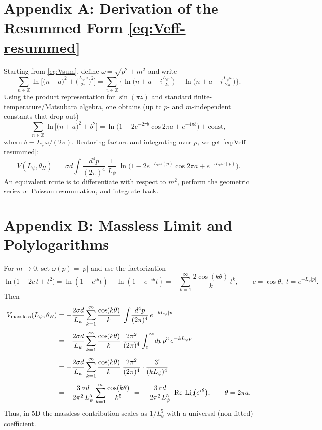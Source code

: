 \documentclass[12pt]{article}
\begin{document}
\section*{Appendix A: Derivation of the Resummed Form \eqref{eq:Veff-resummed}}
Starting from \eqref{eq:Vsum}, define $\omega=\sqrt{p^2+m^2}$ and write
\begin{equation}
\sum_{n\in\mathbb{Z}}\ln\!\Big[ \big(n+a\big)^2 + \big(\tfrac{L_\psi \omega}{2\pi}\big)^2 \Big]
= \sum_{n\in\mathbb{Z}} \Big\{ \ln\!\big( n+a + i \tfrac{L_\psi\omega}{2\pi} \big) + \ln\!\big( n+a - i \tfrac{L_\psi\omega}{2\pi} \big) \Big\}.
\end{equation}
Using the product representation for $\sin(\pi z)$
and standard finite-temperature/Matsubara algebra, one obtains (up to $p$- and $m$-independent constants that drop out)
\begin{equation}
\sum_{n\in\mathbb{Z}}\ln\!\Big[ \big(n+a\big)^2 + b^2 \Big]
= \ln\!\Big(1 - 2 e^{-2\pi b} \cos 2\pi a + e^{-4\pi b}\Big) + \text{const},
\end{equation}
where $b=L_\psi \omega/(2\pi)$.
Restoring factors and integrating over $p$, we get \eqref{eq:Veff-resummed}:
\begin{equation}
V(L_\psi,\theta_H) \;=\; \sigma d \int \!\frac{d^4p}{(2\pi)^4}\; \frac{1}{L_\psi}\;
\ln\!\Big(1 - 2 e^{-L_\psi \omega(p)} \cos 2\pi a + e^{-2 L_\psi \omega(p)}\Big).
\end{equation}
An equivalent route is to differentiate with respect to $m^2$, perform the geometric series or Poisson resummation, and integrate back.

\section*{Appendix B: Massless Limit and Polylogarithms}
For $m\to 0$, set $\omega(p)=|p|$ and use the factorization
\begin{equation}
\ln\!\big(1 - 2 c\, t + t^2\big) = \ln(1-e^{i\theta} t)+\ln(1-e^{-i\theta} t)
= - \sum_{k=1}^\infty \frac{2 \cos(k\theta)}{k}\, t^k,
\qquad c=\cos\theta,\; t=e^{-L_\psi |p|}.
\end{equation}
Then
\begin{align}
V_{\rm massless}(L_\psi,\theta_H)
&= - \frac{2\sigma d}{L_\psi} \sum_{k=1}^\infty \frac{\cos(k\theta)}{k}\;
\int \!\frac{d^4p}{(2\pi)^4}\, e^{-k L_\psi |p|}
\\[4pt]
&= - \frac{2\sigma d}{L_\psi} \sum_{k=1}^\infty \frac{\cos(k\theta)}{k}\;
\frac{2\pi^2}{(2\pi)^4} \int_0^\infty\! dp\, p^3\, e^{-k L_\psi p}
\\[4pt]
&= - \frac{2\sigma d}{L_\psi} \sum_{k=1}^\infty \frac{\cos(k\theta)}{k}\;
\frac{2\pi^2}{(2\pi)^4} \cdot \frac{3!}{(k L_\psi)^4}
\\[4pt]
&= - \frac{3\,\sigma d}{2\pi^2\, L_\psi^5} \sum_{k=1}^\infty \frac{\cos(k\theta)}{k^5}
\;=\; - \frac{3\,\sigma d}{2\pi^2\, L_\psi^5}\; \Re\, \mathrm{Li}_5\!\big(e^{i\theta}\big),
\qquad \theta = 2\pi a.
\end{align}
Thus, in 5D the massless contribution scales as $1/L_\psi^{5}$ with a universal (non-fitted) coefficient.
\end{document}

